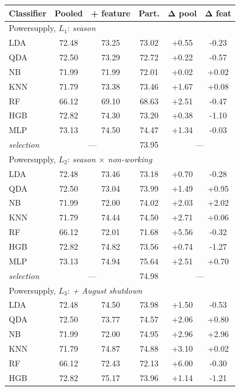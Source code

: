 \begin{tabular}{@{}lccccc@{}}
\toprule
\textbf{Classifier} & \textbf{Pooled} & \textbf{+ feature} & \textbf{Part.} & $\boldsymbol{\Delta}$\textbf{ pool} & $\boldsymbol{\Delta}$\textbf{ feat}\\
\midrule
\multicolumn{6}{l}{Powersupply, $L_1$: \textit{season}}\\
LDA & 72.48 & 73.25 & 73.02 & +0.55 & -0.23 \\
QDA & 72.50 & 73.29 & 72.72 & +0.22 & -0.57 \\
NB & 71.99 & 71.99 & 72.01 & +0.02 & +0.02 \\
KNN & 71.79 & 73.38 & 73.46 & +1.67 & +0.08 \\
RF & 66.12 & 69.10 & 68.63 & +2.51 & -0.47 \\
HGB & 72.82 & 74.30 & 73.20 & +0.38 & -1.10 \\
MLP & 73.13 & 74.50 & 74.47 & +1.34 & -0.03 \\
\textit{selection} & \multicolumn{2}{c}{---} & 73.95 & \multicolumn{2}{c}{---}\\
\midrule
\multicolumn{6}{l}{Powersupply, $L_2$: \textit{season $\times$ non-working}}\\
LDA & 72.48 & 73.46 & 73.18 & +0.70 & -0.28 \\
QDA & 72.50 & 73.04 & 73.99 & +1.49 & +0.95 \\
NB & 71.99 & 72.00 & 74.02 & +2.03 & +2.02 \\
KNN & 71.79 & 74.44 & 74.50 & +2.71 & +0.06 \\
RF & 66.12 & 72.01 & 71.68 & +5.56 & -0.32 \\
HGB & 72.82 & 74.82 & 73.56 & +0.74 & -1.27 \\
MLP & 73.13 & 74.94 & 75.64 & +2.51 & +0.70 \\
\textit{selection} & \multicolumn{2}{c}{---} & 74.98 & \multicolumn{2}{c}{---}\\
\midrule
\multicolumn{6}{l}{Powersupply, $L_3$: \textit{+ August shutdown}}\\
LDA & 72.48 & 74.50 & 73.98 & +1.50 & -0.53 \\
QDA & 72.50 & 73.77 & 74.57 & +2.06 & +0.80 \\
NB & 71.99 & 72.00 & 74.95 & +2.96 & +2.96 \\
KNN & 71.79 & 74.87 & 74.88 & +3.10 & +0.02 \\
RF & 66.12 & 72.43 & 72.13 & +6.00 & -0.30 \\
HGB & 72.82 & 75.17 & 73.96 & +1.14 & -1.21 \\

\end{tabular}
